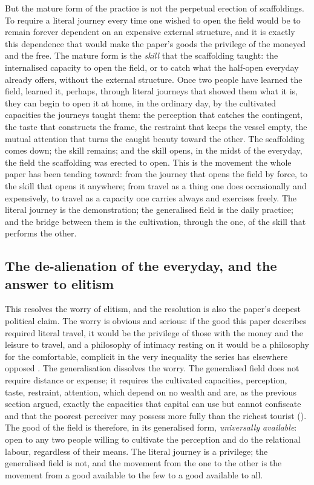 But the mature form of the practice is not the perpetual erection of scaffoldings. To require a literal journey every time one wished to open the field would be to remain forever dependent on an expensive external structure, and it is exactly this dependence that would make the paper's goods the privilege of the moneyed and the free. The mature form is the \emph{skill} that the scaffolding taught: the internalised capacity to open the field, or to catch what the half-open everyday already offers, without the external structure. Once two people have learned the field, learned it, perhaps, through literal journeys that showed them what it is, they can begin to open it at home, in the ordinary day, by the cultivated capacities the journeys taught them: the perception that catches the contingent, the taste that constructs the frame, the restraint that keeps the vessel empty, the mutual attention that turns the caught beauty toward the other. The scaffolding comes down; the skill remains; and the skill opens, in the midst of the everyday, the field the scaffolding was erected to open. This is the movement the whole paper has been tending toward: from the journey that opens the field by force, to the skill that opens it anywhere; from travel as a thing one does occasionally and expensively, to travel as a capacity one carries always and exercises freely. The literal journey is the demonstration; the generalised field is the daily practice; and the bridge between them is the cultivation, through the one, of the skill that performs the other.

\subsection{The de-alienation of the everyday, and the answer to elitism}
\label{p21:sub:gen-dealienation}

This resolves the worry of elitism, and the resolution is also the paper's deepest political claim. The worry is obvious and serious: if the good this paper describes required literal travel, it would be the privilege of those with the money and the leisure to travel, and a philosophy of intimacy resting on it would be a philosophy for the comfortable, complicit in the very inequality the series has elsewhere opposed \parencite{paperxv,paperxvii}. The generalisation dissolves the worry. The generalised field does not require distance or expense; it requires the cultivated capacities, perception, taste, restraint, attention, which depend on no wealth and are, as the previous section argued, exactly the capacities that capital can use but cannot confiscate and that the poorest perceiver may possess more fully than the richest tourist (). The good of the field is therefore, in its generalised form, \emph{universally available}: open to any two people willing to cultivate the perception and do the relational labour, regardless of their means. The literal journey is a privilege; the generalised field is not, and the movement from the one to the other is the movement from a good available to the few to a good available to all.

